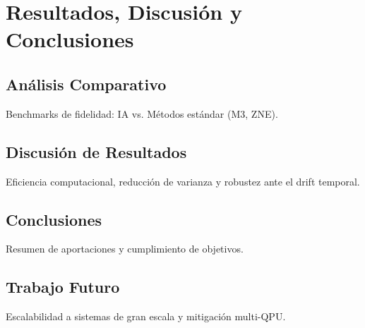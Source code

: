 \chapter{Resultados, Discusión y Conclusiones}
\label{cap:resultados}

\section{Análisis Comparativo}
Benchmarks de fidelidad: IA vs. Métodos estándar (M3, ZNE).

\section{Discusión de Resultados}
Eficiencia computacional, reducción de varianza y robustez ante el drift temporal.

\section{Conclusiones}
Resumen de aportaciones y cumplimiento de objetivos.

\section{Trabajo Futuro}
Escalabilidad a sistemas de gran escala y mitigación multi-QPU.